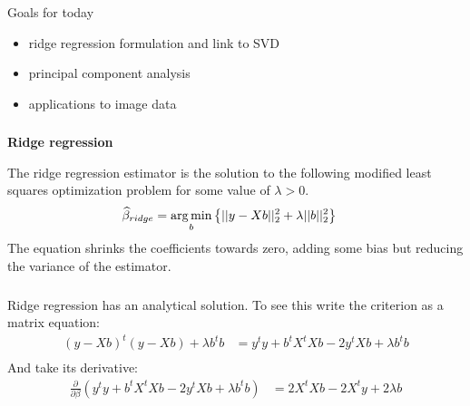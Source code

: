 \begin{frame}[fragile] \frametitle{}

{\color{yaleblue}\fontsize{16pt}{20pt}\selectfont Goals for today}

\begin{itemize}
\item ridge regression formulation and link to SVD
\item principal component analysis
\item applications to image data
\end{itemize}

\end{frame}

\begin{frame}[fragile] \frametitle{}

\textbf{Ridge regression}

The ridge regression estimator is the solution to the following
modified least squares optimization problem for some value of $\lambda > 0$.
\begin{align*}
\widehat{\beta}_{ridge} &= \mathop{\mathrm{arg\,min}}_b \left\{ || y - Xb ||_2^2 + \lambda || b ||_2^2 \right\}
\end{align*}
\pause The equation shrinks the coefficients towards zero, adding some bias but
reducing the variance of the estimator.

\end{frame}

\begin{frame}[fragile] \frametitle{}

Ridge regression has an analytical solution. \pause
To see this write the criterion as a matrix equation:
\begin{align*}
(y - Xb)^t (y - Xb)  + \lambda b^t b
&= y^t y + b^t X^t X b - 2 y^t X b + \lambda b^t b \\
\end{align*}
\pause And take its derivative:
\begin{align*}
\frac{\partial}{\partial \beta} \left( y^t y + b^t X^t X b - 2 y^t X b + \lambda b^t b \right)
&= 2 X^t X b - 2 X^t y + 2 \lambda b
\end{align*}

\end{frame}

